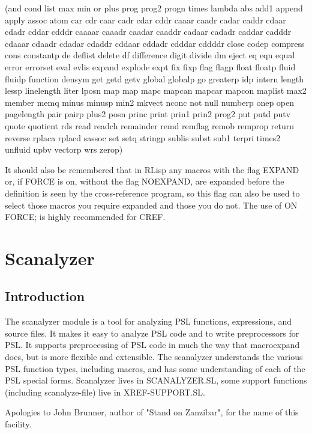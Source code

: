 {}
(and
cond
list
max
min
or
plus
prog
prog2
progn
times
lambda
abs
add1
append
apply
assoc
atom car cdr caar
cadr cdar cddr
caaar caadr cadar
caddr cdaar
cdadr
cddar
cdddr
caaaar
caaadr
caadar
caaddr
cadaar
cadadr
caddar
cadddr
cdaaar
cdaadr
cdadar
cdaddr
cddaar
cddadr
cdddar
cddddr
close
codep
compress cons 
constantp de deflist delete df difference digit divide 
dm eject
eq eqn equal error errorset eval evlis expand explode 
expt fix fixp
flag flagp float floatp fluid  fluidp function densym 
get getd  
getv global globalp go greaterp idp intern length 
lessp linelength
liter lposn map map mapc mapcan mapcar mapcon  
maplist max2 member 
memq minus minusp min2 mkvect nconc not  
null numberp onep
open pagelength pair pairp plus2 posn 
princ print prin1 prin2
prog2 put putd putv quote quotient rds read readch 
remainder remd 
remflag remob remprop return reverse rplaca  
rplacd sassoc set  
setq stringp sublis subst sub1  terpri times2 
unfluid upbv vectorp 
wrs zerop)

  It should also be remembered that in RLisp any  macros    with
the  flag  EXPAND or, if FORCE is on, without the flag NOEXPAND,
are expanded  before  the  definition    is    seen    by    the
cross-reference  program,    so  this  flag  can also be used to
select those macros you require expanded and those you  do  not.
The use of ON FORCE; is highly recommended for CREF.

\section{Scanalyzer}

\subsection{Introduction}

  The  scanalyzer  module is a tool for analyzing PSL functions,
expressions, and source files.  It makes it easy to analyze  PSL
code   and   to  write  preprocessors  for  PSL.    It  supports
preprocessing of PSL code in much the way that macroexpand does,
but is more flexible and extensible.  The scanalyzer understands
the various PSL function types, including macros, and  has  some
understanding  of  each  of  the  PSL special forms.  Scanalyzer
lives in SCANALYZER.SL, some support functions
(including scanalyze-file) live in XREF-SUPPORT.SL.

  Apologies  to John Brunner, author of "Stand on Zanzibar", for
the name of this facility.

